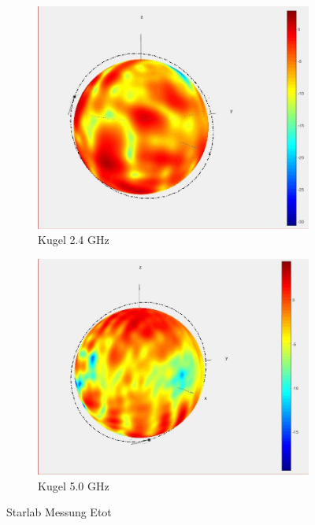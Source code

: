 \begin{figure}[h!]
	\begin{center}
		\begin{subfigure}[t]{0.49\textwidth}
			\begin{center}
				\includegraphics[width=1\textwidth]{../fig/plt/2_4GHz_justsphere.jpg}
				\caption{Kugel 2.4 GHz}
				\label{fig:sphere_2ghz4}
			\end{center}
		\end{subfigure}
		\begin{subfigure}[t]{0.49\textwidth}
			\begin{center}
				\includegraphics[width=1\textwidth]{../fig/plt/5GHz_just_sphere.jpg}
				\caption{Kugel 5.0 GHz}
				\label{fig:sphere_5ghz0}
			\end{center}
		\end{subfigure}
		\caption{Starlab Messung Etot}
		\label{fig:starlab_etot_sphere}
	\end{center}
\end{figure}

